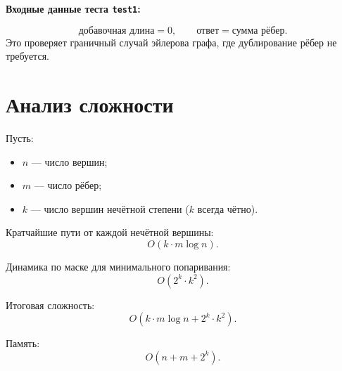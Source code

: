 \documentclass[12pt,a4paper]{article}
\begin{document}
\textbf{Входные данные теста \texttt{test1}:}

{\small
{}
}

\[
\text{добавочная длина} = 0,\qquad
\text{ответ} = \text{сумма рёбер}.
\]
Это проверяет граничный случай эйлерова графа, где дублирование рёбер не требуется.

\section{Анализ сложности}
Пусть:
\begin{itemize}
    \item $n$ --- число вершин;
    \item $m$ --- число рёбер;
    \item $k$ --- число вершин нечётной степени ($k$ всегда чётно).
\end{itemize}

Кратчайшие пути от каждой нечётной вершины:
\[
O(k \cdot m \log n).
\]

Динамика по маске для минимального попаривания:
\[
O(2^k \cdot k^2).
\]

Итоговая сложность:
\[
O(k \cdot m \log n + 2^k \cdot k^2).
\]

Память:
\[
O(n + m + 2^k).
\]
\end{document}
